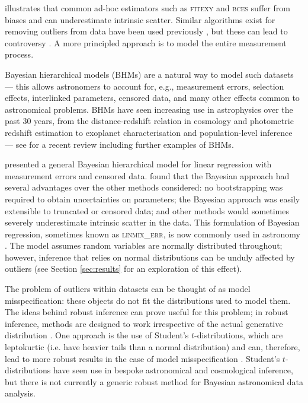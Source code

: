 \documentclass[fleqn,usenatbib]{mnras}
\begin{document}
\citet{Kelly:2007} illustrates that common ad-hoc
estimators such as \textsc{fitexy} \citep{Press:1992, Tremaine:2002} and
\textsc{bces} \citep{Akritas:1996} suffer from biases and can underestimate
intrinsic scatter.
Similar algorithms exist for removing
outliers from data \citep[e.g.][Sigma clipping]{xxxx} have been used previously
\citep[e.g.][]{Riess:xxxx}, but these can
lead to controversy \citep[e.g.][]{Efstathiou:2013}. A more principled approach
is to model the entire measurement process.

Bayesian hierarchical models (BHMs) are a natural way to model such datasets ---
this allows astronomers to account for, e.g., measurement errors, selection
effects, interlinked parameters, censored data, and many other effects common to
astronomical problems. BHMs have seen increasing use in astrophysics over the
past 30 years, from the distance-redshift relation in cosmology
\citep[e.g.][]{Feeney:2018, Avelino:2019} and photometric redshift estimation
\citep[e.g.][]{Leistedt:2016} to exoplanet characterisation
\citep[e.g.][]{Sestovic:2018} and population-level inference
\citep[e.g.][]{Kelly:2009} --- see \citet{Feigelson:2021} for a recent review
including further examples of BHMs.

\citet{Kelly:2007} presented a general Bayesian hierarchical
model for linear regression with measurement errors and censored data.
\citeauthor{Kelly:2007} found that the Bayesian approach had several advantages
over the other methods considered: no bootstrapping was required to obtain
uncertainties on parameters; the Bayesian approach was easily extensible to
truncated or censored data; and other methods would sometimes severely
underestimate intrinsic scatter in the data. This formulation of Bayesian
regression, sometimes known as \textsc{linmix\_err}, is now commonly used in
astronomy \citep[e.g.][]{McConnell:2013, Bentz:2013, Andrews:2013}.
The model assumes random variables are normally distributed throughout; however,
inference that relies on normal distributions can be unduly affected by outliers
(see Section \ref{sec:results} for an exploration of this effect).

The problem of outliers within datasets can be thought of as model
misspecification: these objects do not fit the distributions used to model them.
The ideas behind robust inference can prove useful for this problem; in robust
inference, methods are designed to work irrespective of the actual generative
distribution {\color{red} \citep{Berger:1994}}. One approach is the use of
Student's $t$-distributions, which are leptokurtic (i.e. have heavier tails than
a normal distribution) and can, therefore, lead to more robust results in the
case of model misspecification \citep[e.g.][]{Berger:1994, Gelman:2013}.
Student's $t$-distributions have seen use in bespoke astronomical
\citep[e.g.][]{Park:2017} and cosmological \citep[e.g.][]{Feeney:2018}
inference, but there is not currently a generic robust method for Bayesian
astronomical data analysis.
\end{document}
